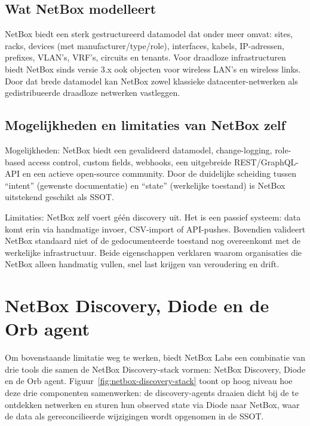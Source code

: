 \subsection{Wat NetBox modelleert}

NetBox biedt een sterk gestructureerd datamodel dat onder meer omvat: sites, racks, devices (met manufacturer/type/role), interfaces, kabels, IP-adressen, prefixes, VLAN's, VRF's, circuits en tenants. Voor draadloze infrastructuren biedt NetBox sinds versie 3.x ook objecten voor wireless LAN's en wireless links. Door dat brede datamodel kan NetBox zowel klassieke datacenter-netwerken als gedistribueerde draadloze netwerken vastleggen.

\subsection{Mogelijkheden en limitaties van NetBox zelf}

Mogelijkheden: NetBox biedt een gevalideerd datamodel, change-logging, role-based access control, custom fields, webhooks, een uitgebreide REST/GraphQL-API en een actieve open-source community\autocite{NetBoxOSS}. Door de duidelijke scheiding tussen ``intent'' (gewenste documentatie) en ``state'' (werkelijke toestand) is NetBox uitstekend geschikt als SSOT.

Limitaties: NetBox zelf voert g\'e\'en discovery uit. Het is een passief systeem: data komt erin via handmatige invoer, CSV-import of API-pushes. Bovendien valideert NetBox standaard niet of de gedocumenteerde toestand nog overeenkomt met de werkelijke infrastructuur. Beide eigenschappen verklaren waarom organisaties die NetBox alleen handmatig vullen, snel last krijgen van veroudering en drift.

\section{NetBox Discovery, Diode en de Orb agent}
\label{sec:netbox-discovery-stack}

Om bovenstaande limitatie weg te werken, biedt NetBox Labs een combinatie van drie tools die samen de NetBox Discovery-stack vormen: NetBox Discovery, Diode en de Orb agent. Figuur~\ref{fig:netbox-discovery-stack} toont op hoog niveau hoe deze drie componenten samenwerken: de discovery-agents draaien dicht bij de te ontdekken netwerken en sturen hun observed state via Diode naar NetBox, waar de data als gereconcilieerde wijzigingen wordt opgenomen in de SSOT.

